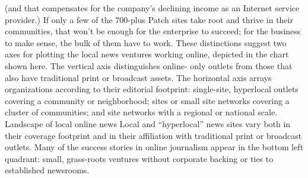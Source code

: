 (and that compensates for the company's declining income as an Internet service
provider.) If only a few of the 700-plus Patch sites take root and thrive in their
communities, that won't be enough for the enterprise to succeed; for the business
to make sense, the bulk of them have to work.
These distinctions suggest two axes for plotting the local news ventures working
online, depicted in the chart shown here. The vertical axis distinguishes online-
only outlets from those that also have traditional print or broadcast assets.
The horizontal axis arrays organizations according to their editorial footprint:
single-site, hyperlocal outlets covering a community or neighborhood; sites or
small site networks covering a cluster of communities; and site networks with a
regional or national scale.
Landscape of local online news
Local and ``hyperlocal'' news sites vary both in their coverage footprint and in their
affiliation with traditional print or broadcast outlets. Many of the success stories in
online journalism appear in the bottom left quadrant: small, grass-roots ventures
without corporate backing or ties to established newsrooms.

